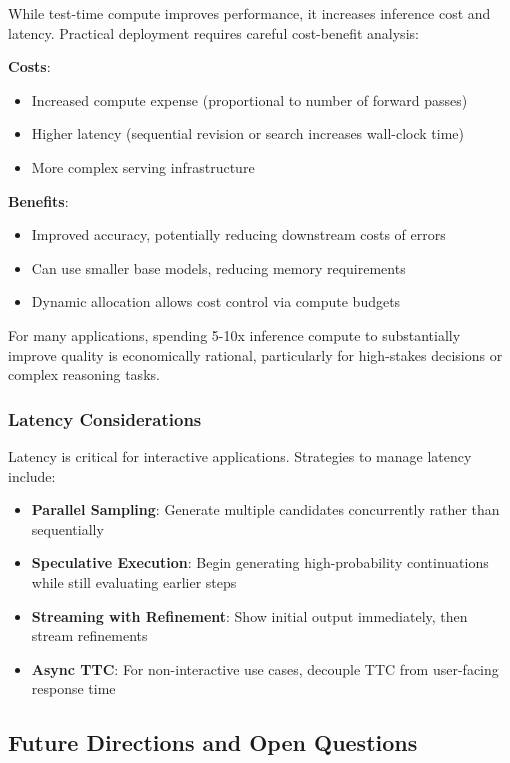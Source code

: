 While test-time compute improves performance, it increases inference cost and latency. Practical deployment requires careful cost-benefit analysis:

\textbf{Costs}:
\begin{itemize}
    \item Increased compute expense (proportional to number of forward passes)
    \item Higher latency (sequential revision or search increases wall-clock time)
    \item More complex serving infrastructure
\end{itemize}

\textbf{Benefits}:
\begin{itemize}
    \item Improved accuracy, potentially reducing downstream costs of errors
    \item Can use smaller base models, reducing memory requirements
    \item Dynamic allocation allows cost control via compute budgets
\end{itemize}

For many applications, spending 5-10x inference compute to substantially improve quality is economically rational, particularly for high-stakes decisions or complex reasoning tasks.

\subsubsection{Latency Considerations}

Latency is critical for interactive applications. Strategies to manage latency include:

\begin{itemize}
    \item \textbf{Parallel Sampling}: Generate multiple candidates concurrently rather than sequentially
    \item \textbf{Speculative Execution}: Begin generating high-probability continuations while still evaluating earlier steps
    \item \textbf{Streaming with Refinement}: Show initial output immediately, then stream refinements
    \item \textbf{Async TTC}: For non-interactive use cases, decouple TTC from user-facing response time
\end{itemize}

\subsection{Future Directions and Open Questions}


